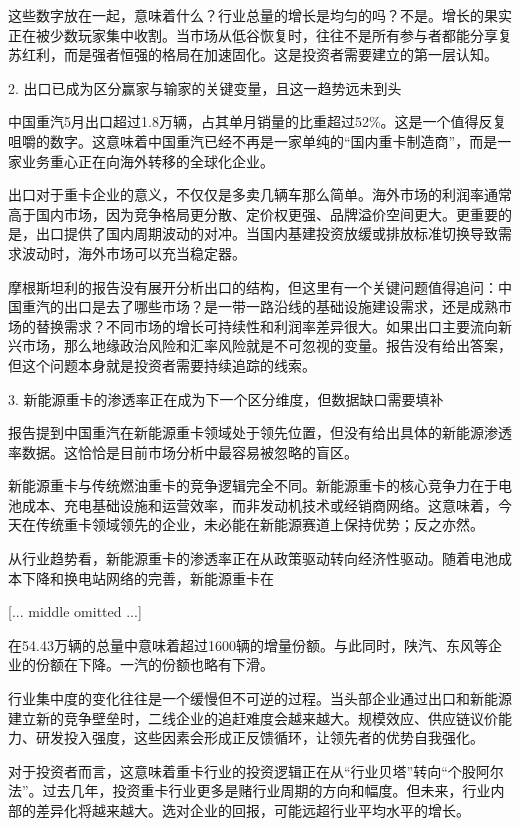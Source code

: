\documentclass[11pt]{ctexart}
\begin{document}
这些数字放在一起，意味着什么？行业总量的增长是均匀的吗？不是。增长的果实正在被少数玩家集中收割。当市场从低谷恢复时，往往不是所有参与者都能分享复苏红利，而是强者恒强的格局在加速固化。这是投资者需要建立的第一层认知。

2. 出口已成为区分赢家与输家的关键变量，且这一趋势远未到头

中国重汽5月出口超过1.8万辆，占其单月销量的比重超过52\%。这是一个值得反复咀嚼的数字。这意味着中国重汽已经不再是一家单纯的“国内重卡制造商”，而是一家业务重心正在向海外转移的全球化企业。

出口对于重卡企业的意义，不仅仅是多卖几辆车那么简单。海外市场的利润率通常高于国内市场，因为竞争格局更分散、定价权更强、品牌溢价空间更大。更重要的是，出口提供了国内周期波动的对冲。当国内基建投资放缓或排放标准切换导致需求波动时，海外市场可以充当稳定器。

摩根斯坦利的报告没有展开分析出口的结构，但这里有一个关键问题值得追问：中国重汽的出口是去了哪些市场？是一带一路沿线的基础设施建设需求，还是成熟市场的替换需求？不同市场的增长可持续性和利润率差异很大。如果出口主要流向新兴市场，那么地缘政治风险和汇率风险就是不可忽视的变量。报告没有给出答案，但这个问题本身就是投资者需要持续追踪的线索。

3. 新能源重卡的渗透率正在成为下一个区分维度，但数据缺口需要填补

报告提到中国重汽在新能源重卡领域处于领先位置，但没有给出具体的新能源渗透率数据。这恰恰是目前市场分析中最容易被忽略的盲区。

新能源重卡与传统燃油重卡的竞争逻辑完全不同。新能源重卡的核心竞争力在于电池成本、充电基础设施和运营效率，而非发动机技术或经销商网络。这意味着，今天在传统重卡领域领先的企业，未必能在新能源赛道上保持优势；反之亦然。

从行业趋势看，新能源重卡的渗透率正在从政策驱动转向经济性驱动。随着电池成本下降和换电站网络的完善，新能源重卡在

[... middle omitted ...]

在54.43万辆的总量中意味着超过1600辆的增量份额。与此同时，陕汽、东风等企业的份额在下降。一汽的份额也略有下滑。

行业集中度的变化往往是一个缓慢但不可逆的过程。当头部企业通过出口和新能源建立新的竞争壁垒时，二线企业的追赶难度会越来越大。规模效应、供应链议价能力、研发投入强度，这些因素会形成正反馈循环，让领先者的优势自我强化。

对于投资者而言，这意味着重卡行业的投资逻辑正在从“行业贝塔”转向“个股阿尔法”。过去几年，投资重卡行业更多是赌行业周期的方向和幅度。但未来，行业内部的差异化将越来越大。选对企业的回报，可能远超行业平均水平的增长。
\end{document}
